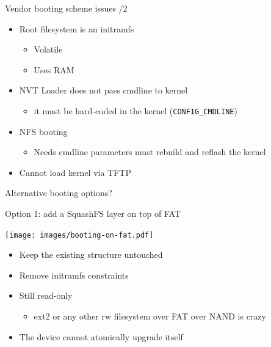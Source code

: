 \documentclass[xetex,table]{beamer}
\begin{document}
\begin{frame}{Vendor booting scheme issues /2}
  \begin{itemize}
  \item Root filesystem is an initramfs
    \begin{itemize}
    \item Volatile
    \item Uses RAM
    \end{itemize}
  \item NVT Loader does not pass cmdline to kernel
    \begin{itemize}
    \item it must be hard-coded in the kernel (\texttt{CONFIG\_CMDLINE})
    \end{itemize}
  \item NFS booting
    \begin{itemize}
    \item Needs cmdline parameters \textrightarrow{} must rebuild and
      reflash the kernel
    \end{itemize}
  \item Cannot load kernel via TFTP
  \end{itemize}
\end{frame}

\begin{frame}[standout]
  \begin{center}
    Alternative booting options?
  \end{center}
\end{frame}

\begin{frame}{Option 1: add a SquashFS layer on top of FAT}
  \begin{center}
    \texttt{[image: images/booting-on-fat.pdf]}
  \end{center}
  \begin{itemize}
  \item Keep the existing structure untouched
  \item Remove initramfs constraints
  \item Still read-only
    \begin{itemize}
    \item ext2 or any other rw filesystem over FAT over NAND is crazy
    \end{itemize}
  \item The device cannot atomically upgrade itself
  \end{itemize}
\end{frame}
\end{document}
